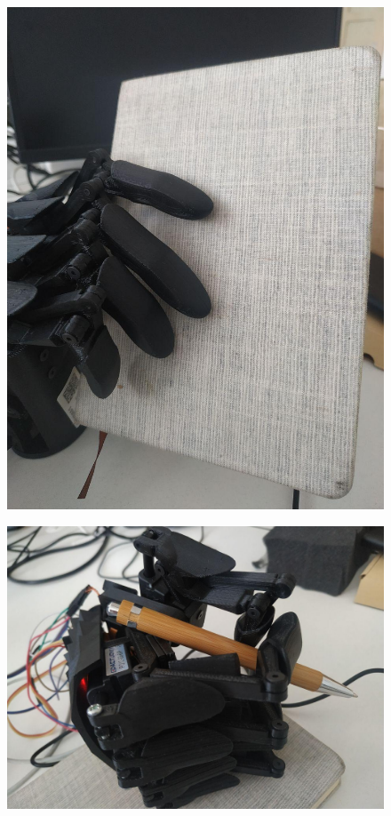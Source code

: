 \documentclass[thesis=B,czech]{FITthesis}[2012/06/26]
\begin{document}
 \begin{figure}[H]
\centering
\includegraphics[scale=0.3]{./image/testSolF2.jpg}
\end{figure} 


 \begin{figure}[H]
\centering
\includegraphics[scale=0.3]{./image/testSolF3.jpg}
\end{figure} 
\end{document}
